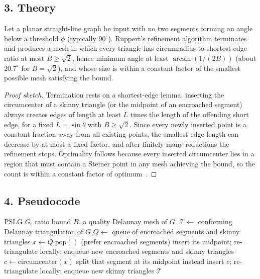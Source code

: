 \subsection{3. Theory}

\begin{theorem}\label{thm:ruppert}
Let a planar straight-line graph be input with no two segments forming an
angle below a threshold $\phi$ (typically $90^\circ$). Ruppert's refinement
algorithm terminates and produces a mesh in which every triangle has
circumradius-to-shortest-edge ratio at most $B \ge \sqrt{2}$, hence minimum
angle at least $\arcsin(1/(2B))$ (about $20.7^\circ$ for $B = \sqrt{2}$), and
whose size is within a constant factor of the smallest possible mesh satisfying
the bound.
\end{theorem}

\begin{proof}[Proof sketch]
Termination rests on a shortest-edge lemma: inserting the circumcenter of a
skinny triangle (or the midpoint of an encroached segment) always creates edges
of length at least $L$ times the length of the offending short edge, for a fixed
$L = \sin\theta$ with $B \ge \sqrt{2}$. Since every newly inserted point is a
constant fraction away from all existing points, the smallest edge length can
decrease by at most a fixed factor, and after finitely many reductions the
refinement stops. Optimality follows because every inserted circumcenter lies
in a region that must contain a Steiner point in any mesh achieving the bound,
so the count is within a constant factor of optimum~\cite{ruppert1995,shewchuk1998}.
\end{proof}

\subsection{4. Pseudocode}

\begin{algorithm}[htbp]
\caption{Ruppert Delaunay Refinement}
\label{alg:ruppert_refine}
\begin{algorithmic}[1]
\Require PSLG $G$, ratio bound $B$.
\Ensure a quality Delaunay mesh of $G$.
  \State $\mathcal{T} \gets $ conforming Delaunay triangulation of $G$
  \State $Q \gets $ queue of encroached segments and skinny triangles
    \State $x \gets Q.\text{pop}()$ (prefer encroached segments)
      \State insert its midpoint; re-triangulate locally; enqueue new
             encroached segments and skinny triangles
    \Else {}
      \State $c \gets \text{circumcenter}(x)$
        \State split that segment at its midpoint instead
      \Else
        \State insert $c$; re-triangulate locally; enqueue new skinny triangles
      \EndIf
    \EndIf
  \EndWhile
  \State \Return $\mathcal{T}$
\EndFunction
\end{algorithmic}
\end{algorithm}

